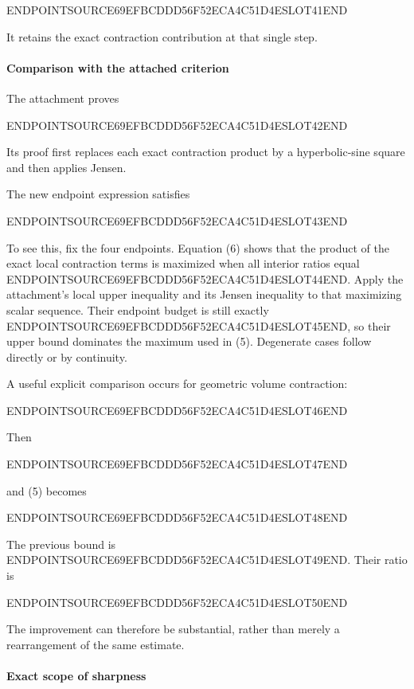 ENDPOINTSOURCE69EFBCDDD56F52ECA4C51D4ESLOT41END

It retains the exact contraction contribution at that single step.

\paragraph{Comparison with the attached criterion}\label{endpoint-user_product_original--comparison-with-the-attached-criterion}

The attachment proves

ENDPOINTSOURCE69EFBCDDD56F52ECA4C51D4ESLOT42END

Its proof first replaces each exact contraction product by a hyperbolic-sine square and then applies Jensen.

The new endpoint expression satisfies

ENDPOINTSOURCE69EFBCDDD56F52ECA4C51D4ESLOT43END

To see this, fix the four endpoints. Equation (6) shows that the product of the exact local contraction terms is maximized when all interior ratios equal ENDPOINTSOURCE69EFBCDDD56F52ECA4C51D4ESLOT44END. Apply the attachment's local upper inequality and its Jensen inequality to that maximizing scalar sequence. Their endpoint budget is still exactly ENDPOINTSOURCE69EFBCDDD56F52ECA4C51D4ESLOT45END, so their upper bound dominates the maximum used in (5). Degenerate cases follow directly or by continuity.

A useful explicit comparison occurs for geometric volume contraction:

ENDPOINTSOURCE69EFBCDDD56F52ECA4C51D4ESLOT46END

Then

ENDPOINTSOURCE69EFBCDDD56F52ECA4C51D4ESLOT47END

and (5) becomes

ENDPOINTSOURCE69EFBCDDD56F52ECA4C51D4ESLOT48END

The previous bound is ENDPOINTSOURCE69EFBCDDD56F52ECA4C51D4ESLOT49END. Their ratio is

ENDPOINTSOURCE69EFBCDDD56F52ECA4C51D4ESLOT50END

The improvement can therefore be substantial, rather than merely a rearrangement of the same estimate.

\paragraph{Exact scope of sharpness}\label{endpoint-user_product_original--exact-scope-of-sharpness}

